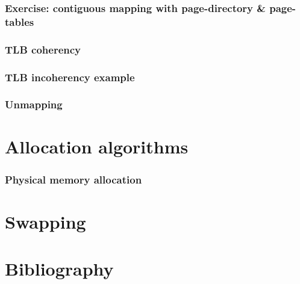 
\begin{frame}
  \frametitle{Exercise: contiguous mapping with page-directory \&
  page-tables}

\end{frame}


\begin{frame}
  \frametitle{TLB coherency}

\end{frame}


\begin{frame}
  \frametitle{TLB incoherency example}

\end{frame}


\begin{frame}
  \frametitle{Unmapping}

\end{frame}

%
%

\section{Allocation algorithms}


\begin{frame}
  \frametitle{Physical memory allocation}

\end{frame}


%
%

\section{Swapping}

%
%

\section{Bibliography}

\begin{thebibliography}{4}


\end{thebibliography}


